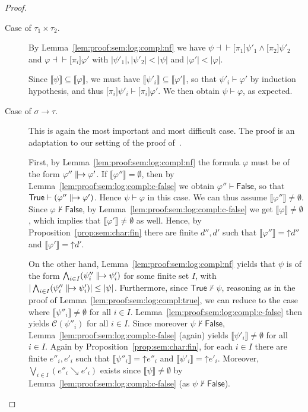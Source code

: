 \documentclass[%
  a4paper,
  UKenglish,
  cleveref,
  autoref,
  thm-restate,
  numberwithinsect,
]{lipics-v2021}
\newcommand\sle\subseteq
\newcommand\thesis{\vdash}
\newcommand\defthesisiff{\dashv\vdash}
\newcommand\thesisiff{\mathrel{\defthesisiff}}
\newcommand\up{\mathord{\uparrow}}
\newcommand\I[1]{\llbracket #1 \rrbracket} %
\newcommand\C{\mathcal{C}}		%
\newcommand\temp[1]{\mathsf{#1}}
\newcommand\True{\temp{True}}
\newcommand\False{\temp{False}}
\newcommand\arrow\to
\newcommand\defrealto{\mathrel\parallel\joinrel\to}
\newcommand\realto{\mathrel{\defrealto}}
\newcommand\PT{\tau}		%
\newcommand\PTbis{\sigma}	%
\newcommand\step{\searrow}
\newcommand\form[1]{\lbrack #1 \rbrack}
\begin{document}
\begin{proof}
\begin{description}
\item[Case of $\PT_1 \times \PT_2$.]
By Lemma~\ref{lem:proof:sem:log:compl:nf}
we have
$\psi \thesisiff \form{\pi_1} \psi'_1 \land \form{\pi_2} \psi'_2$
and $\varphi \thesisiff \form{\pi_i} \varphi'$
with $|\psi'_1|, |\psi'_2| < |\psi|$
and $|\varphi'| < |\varphi|$.

Since $\I\psi \sle \I\varphi$,
we must have
$\I{\psi'_i} \sle \I{\varphi'}$,
so that
$\psi'_i \thesis \varphi'$ by induction hypothesis,
and thus
$\form{\pi_i}\psi'_i \thesis \form{\pi_i}\varphi'$.
We then obtain $\psi \thesis \varphi$, as expected.

\item[Case of $\PTbis \arrow \PT$.]
This is again the most important and most difficult case.
The proof is an adaptation to our setting
of the proof of~\cite[Proposition 10.5.2]{ac98book}.

First, 
by Lemma~\ref{lem:proof:sem:log:compl:nf}
the formula
$\varphi$ must be of the form $\varphi'' \realto \varphi'$.
If $\I{\varphi''} = \emptyset$,
then by Lemma~\ref{lem:proof:sem:log:compl:c-false}
we obtain $\varphi'' \thesis \False$,
so that $\True \thesis (\varphi'' \realto \varphi')$.
Hence $\psi \thesis \varphi$ in this case.
%
We can thus assume $\I{\varphi''} \neq \emptyset$.
Since $\varphi \not\thesis \False$,
by Lemma~\ref{lem:proof:sem:log:compl:c-false}
we get
$\I\varphi \neq \emptyset$,
which implies that $\I{\varphi'} \neq \emptyset$ as well.
Hence, by Proposition~\ref{prop:sem:char:fin}
there are finite $d'',d'$
such that $\I{\varphi''} = \up d''$
and $\I{\varphi'} = \up d'$.


On the other hand,
Lemma~\ref{lem:proof:sem:log:compl:nf} yields that
$\psi$ is of the form
$\bigwedge_{i \in I} (\psi''_i \realto \psi'_i)$
for some finite set $I$,
with
$|\bigwedge_{i \in I} (\psi''_i \realto \psi'_i)| \leq |\psi|$.
Furthermore, since $\True \not\thesis \psi$,
reasoning as in the proof of Lemma~\ref{lem:proof:sem:log:compl:true},
we can reduce to the case where 
$\I{\psi''_i} \neq \emptyset$ for all $i \in I$.
Lemma~\ref{lem:proof:sem:log:compl:c-false}
then yields $\C(\psi''_i)$ for all $i \in I$.
%
Since moreover $\psi \not\thesis \False$,
Lemma~\ref{lem:proof:sem:log:compl:c-false} (again) yields
$\I{\psi'_i} \neq \emptyset$ for all $i \in I$.
%
Again by Proposition~\ref{prop:sem:char:fin},
for each $i \in I$ there are finite $e''_i,e'_i$
such that $\I{\psi''_i} = \up e''_i$
and $\I{\psi'_i} = \up e'_i$.
%
Moreover, $\bigvee_{i \in I}(e''_i \step e'_i)$
exists since $\I\psi \neq \emptyset$
by Lemma~\ref{lem:proof:sem:log:compl:c-false}
(as $\psi \not\thesis \False$).



\end{description}
\end{proof}
\end{document}
